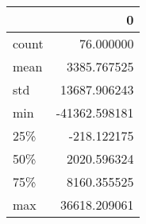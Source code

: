 \begin{tabular}{lr}
\toprule
{} &             0 \\
\midrule
count &     76.000000 \\
mean  &   3385.767525 \\
std   &  13687.906243 \\
min   & -41362.598181 \\
25\%   &   -218.122175 \\
50\%   &   2020.596324 \\
75\%   &   8160.355525 \\
max   &  36618.209061 \\
\bottomrule
\end{tabular}
